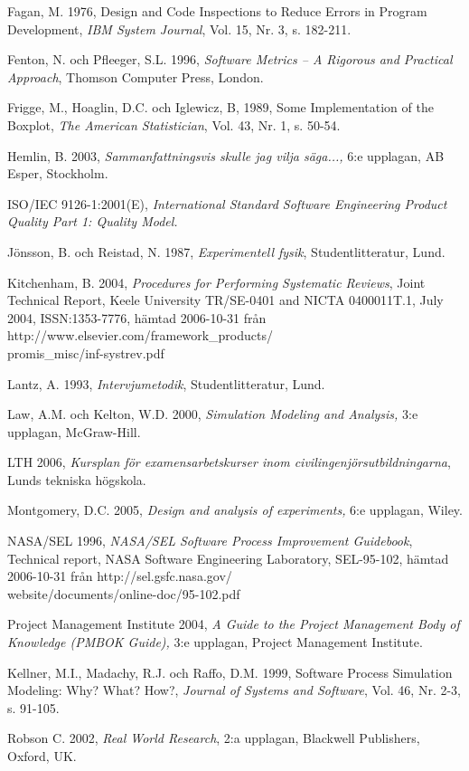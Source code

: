 Fagan, M. 1976, Design and Code Inspections to Reduce Errors in Program
Development, \emph{IBM System Journal}, Vol. 15, Nr. 3, s. 182-211.

Fenton, N. och Pfleeger, S.L. 1996, \emph{Software Metrics -- A Rigorous
and Practical Approach}, Thomson Computer Press, London.

Frigge, M., Hoaglin, D.C. och Iglewicz, B, 1989, Some Implementation of
the Boxplot, \emph{The American Statistician}, Vol. 43, Nr. 1, s. 50-54.

Hemlin, B. 2003, \emph{Sammanfattningsvis skulle jag vilja säga...,} 6:e
upplagan, AB Esper, Stockholm.

ISO/IEC 9126-1:2001(E), \emph{International Standard Software
Engineering Product Quality Part 1: Quality Model.}

Jönsson, B. och Reistad, N. 1987, \emph{Experimentell fysik},
Studentlitteratur, Lund.

Kitchenham, B. 2004, \emph{Procedures for Performing Systematic
Reviews}, Joint Technical Report, Keele University TR/SE-0401 and NICTA
0400011T.1, July 2004, ISSN:1353-7776, hämtad 2006-10-31 från
http://www.elsevier.com/framework\_products/\\
promis\_misc/inf-systrev.pdf

Lantz, A. 1993, \emph{Intervjumetodik}, Studentlitteratur, Lund.

Law, A.M. och Kelton, W.D. 2000, \emph{Simulation Modeling and
Analysis,} 3:e upplagan, McGraw-Hill.

LTH 2006, \emph{Kursplan för examensarbetskurser inom
civilingenjörsutbildningarna}, Lunds tekniska högskola.

Montgomery, D.C. 2005, \emph{Design and analysis of experiments,} 6:e
upplagan, Wiley.

NASA/SEL 1996, \emph{NASA/SEL Software Process Improvement Guidebook},
Technical report, NASA Software Engineering Laboratory, SEL-95-102,
hämtad 2006-10-31 från http://sel.gsfc.nasa.gov/\\
website/documents/online-doc/95-102.pdf

Project Management Institute 2004, \emph{A Guide to the Project
Management Body of Knowledge (PMBOK Guide),} 3:e upplagan, Project
Management Institute.

Kellner, M.I., Madachy, R.J. och Raffo, D.M. 1999, Software Process
Simulation Modeling: Why? What? How?, \emph{Journal of Systems and
Software}, Vol. 46, Nr. 2-3, s. 91-105.

Robson C. 2002, \emph{Real World Research}, 2:a upplagan, Blackwell
Publishers, Oxford, UK.

